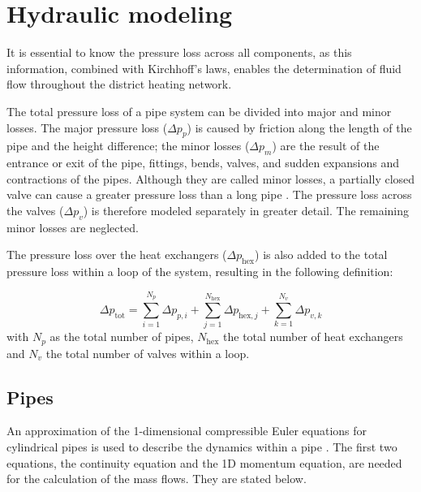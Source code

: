 \section{Hydraulic modeling}\label{sec::hydromodel}
It is essential to know the pressure loss across all components, as this information, combined with Kirchhoff's laws, enables the determination of fluid flow throughout the district heating network. 

The total pressure loss of a pipe system can be divided into major and minor losses. The major pressure loss ($\Delta p_p$) is caused by friction along the length of the pipe and the height difference; the minor losses ($\Delta p_m$) are the result of the entrance or exit of the pipe, fittings, bends, valves, and sudden expansions and contractions of the pipes. Although they are called minor losses, a partially closed valve can cause a greater pressure loss than a long pipe \cite{white2011fluid}. The pressure loss across the valves ($\Delta p_{v}$) is therefore modeled separately in greater detail. The remaining minor losses are neglected. 

The pressure loss over the heat exchangers ($\Delta p_{\text{hex}}$) is also added to the total pressure loss within a loop of the system, resulting in the following definition:  

\begin{equation}
    \Delta p_{\text{tot}} = \sum^{N_p}_{i=1} \Delta p_{p,i} + \sum^{N_{\text{hex}}}_{j=1} \Delta p_{\text{hex},j} + \sum^{N_v}_{k=1}\Delta p_{v,k}
\end{equation}
with $N_p$ as the total number of pipes, $N_{\text{hex}}$ the total number of heat exchangers and $N_v$ the total number of valves within a loop. 

\subsection{Pipes}\label{sec::hydropipes}
An approximation of the 1-dimensional compressible Euler equations for cylindrical pipes is used to describe the dynamics within a pipe \cite{Krug2020}. The first two equations, the continuity equation and the 1D momentum equation, are needed for the calculation of the mass flows. They are stated below.

